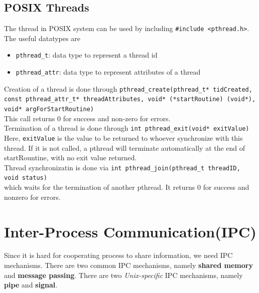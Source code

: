\documentclass[12pt]{article}
\theoremstyle{definition}
\begin{document}
\subsection{POSIX Threads}
The thread in POSIX system can be used by including \texttt{\#include <pthread.h>}. The useful datatypes are
\begin{itemize}
  \item \texttt{pthread\_t}: data type to represent a thread id
  \item \texttt{pthread\_attr}: data type to represent attributes of a thread
\end{itemize}
Creation of a thread is done through
\texttt{pthread\_create(pthread\_t* tidCreated, const pthread\_attr\_t* threadAttributes, void* (*startRoutine) (void*), void* argForStartRoutine)}\\
This call returns $0$ for success and non-zero for errors.\\
Termination of a thread is done through
\texttt{int pthread\_exit(void* exitValue)}\\
Here, \texttt{exitValue} is the value to be returned to whoever synchronize with this thread. If it is not called, a pthread will terminate automatically at the end of startRountine, with no exit value returned.\\

Thread synchronizatin is done via
\texttt{int pthread\_join(pthread\_t threadID, void \*\*status)}\\
which waits for the termination of another pthread. It returns $0$ for success and nonzero for errors.

\section{Inter-Process Communication(IPC)}
Since it is hard for cooperating process to share information, we need IPC mechanisms. There are two common IPC mechanisms, namely \textbf{shared memory} and \textbf{message passing}. There are two \textit{Unix-specific} IPC mechanisms, namely \textbf{pipe} and \textbf{signal}.
\end{document}
